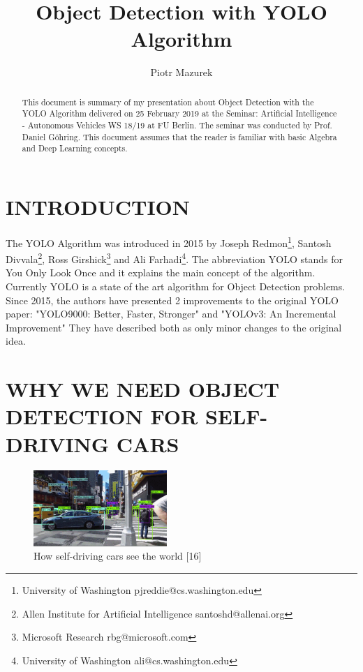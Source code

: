 \documentclass[letterpaper, 10 pt, conference]{ieeeconf}  %
\title{\LARGE \bf
Object Detection with YOLO Algorithm}
\author{Piotr Mazurek}
\begin{document}
\maketitle
\thispagestyle{empty}
\pagestyle{empty}


\begin{abstract}

This document is summary of my presentation about Object Detection with the YOLO Algorithm delivered on 25 February 2019 at the Seminar: Artificial Intelligence - Autonomous Vehicles WS 18/19 at FU Berlin. The seminar was conducted by Prof. Daniel G{\"o}hring. This document assumes that the reader is familiar with basic Algebra and Deep Learning concepts.

\end{abstract}


\section{INTRODUCTION}

The YOLO Algorithm was introduced in 2015 by Joseph Redmon\footnote{University of Washington pjreddie@cs.washington.edu}, Santosh Divvala\footnote{Allen Institute for Artificial Intelligence santoshd@allenai.org}, Ross Girshick\footnote{Microsoft Research rbg@microsoft.com} and Ali Farhadi\footnote{University of Washington ali@cs.washington.edu}. The abbreviation YOLO stands for You Only Look Once and it explains the main concept of the algorithm. Currently YOLO is a state of the art algorithm for Object Detection problems. Since 2015, the authors have presented 2 improvements to the original YOLO paper: "YOLO9000: Better, Faster, Stronger" and "YOLOv3: An Incremental Improvement" They have described both as only minor changes to the original idea.

\section{WHY WE NEED OBJECT DETECTION FOR SELF-DRIVING CARS}
\begin{figure}[ht]
	\centering
    \includegraphics[width=0.45\textwidth]{Pictures/self_drive_see.png}
	\caption{How self-driving cars see the world [16]}
\end{figure}
\end{document}
